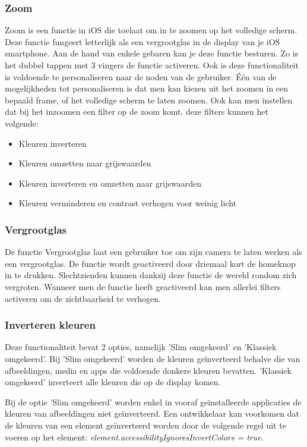\subsubsection{Zoom}
Zoom is een functie in iOS die toelaat om in te zoomen op het volledige scherm. Deze functie fungeert letterlijk als een vergrootglas in de display van je iOS smartphone. Aan de hand van enkele gebaren kan je deze functie besturen. Zo is het dubbel tappen met 3 vingers de functie activeren. Ook is deze functionaliteit is voldoende te personaliseren naar de noden van de gebruiker. Één van de mogelijkheden tot personaliseren is dat men kan kiezen uit het zoomen in een bepaald frame, of het volledige scherm te laten zoomen. Ook kan men instellen dat bij het inzoomen een filter op de zoom komt, deze filters kunnen het volgende: \begin{itemize}
    \item Kleuren inverteren
    \item Kleuren omzetten naar grijswaarden
    \item Kleuren inverteren en omzetten naar grijswaarden
    \item Kleuren verminderen en contrast verhogen voor weinig licht
\end{itemize}

\subsubsection{Vergrootglas}
De functie Vergrootglas laat een gebruiker toe om zijn camera te laten werken als een vergrootglas. De functie wordt geactiveerd door driemaal kort de homeknop in te drukken. 
Slechtzienden kunnen dankzij deze functie de wereld rondom zich vergroten. Wanneer men de functie heeft geactiveerd kan men allerlei filters activeren om de zichtbaarheid te verhogen.
\subsubsection{Inverteren kleuren}
Deze functionaliteit bevat 2 opties, namelijk 'Slim omgekeerd'  en 'Klassiek omgekeerd'. Bij 'Slim omgekeerd' worden de kleuren geïnverteerd behalve die van afbeeldingen, media en apps die voldoende donkere kleuren bevatten. 'Klassiek omgekeerd' inverteert alle kleuren die op de display komen.

Bij de optie 'Slim omgekeerd' worden enkel in vooraf geïnstalleerde applicaties de kleuren van afbeeldingen niet geïnverteerd.  Een ontwikkelaar kan voorkomen dat de kleuren van een element geïnverteerd worden door de volgende regel uit te voeren op het element: \emph{element.accessibilityIgnoresInvertColors = true}.

